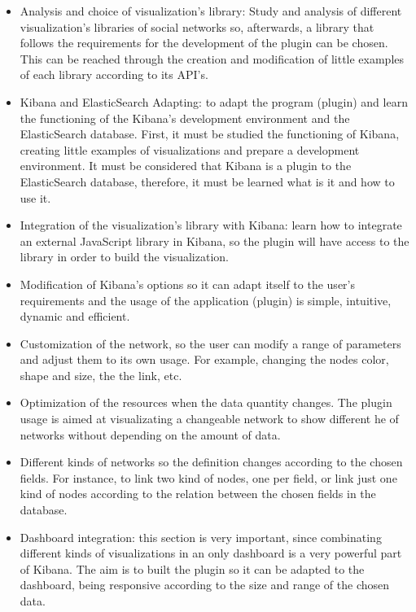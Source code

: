 \documentclass[a4paper, 12pt]{book}
\begin{document}
\begin{itemize}
\item Analysis and choice of visualization’s library: Study and analysis of different visualization’s libraries of social networks so, afterwards, a library that follows the requirements for the development of the plugin can be chosen. This can be reached through the creation and modification of little examples of each library according to its API's.
\item Kibana and ElasticSearch Adapting: to adapt the program (plugin) and learn the functioning of the Kibana's development environment and the ElasticSearch database. First, it must be studied the functioning of Kibana, creating little examples of visualizations and prepare a development environment. It must be considered that Kibana is a plugin to the ElasticSearch database, therefore, it must be learned what is it and how to use it.
\item Integration of the visualization’s library with Kibana: learn how to integrate an external JavaScript library in Kibana, so the plugin will have access to the library in order to build the visualization.
\item Modification of Kibana's options so it can adapt itself to the user's requirements and the usage of the application (plugin) is simple, intuitive, dynamic and efficient.
\item Customization of the network, so the user can modify a range of parameters and adjust them to its own usage. For example, changing the nodes color, shape and size, the the link, etc.
\item Optimization of the resources when the data quantity changes. The plugin usage is aimed at visualizating a changeable network to show different he of networks without depending on the amount of data.
\item Different kinds of networks so the definition changes according to the chosen fields. For instance, to link two kind of nodes, one per field, or link just one kind of nodes according to the relation between the chosen fields in the database.
\item Dashboard integration: this section is very important, since combinating different kinds of visualizations in an only dashboard is a very powerful part of Kibana. The aim is to built the plugin so it can be adapted to the dashboard, being responsive according to the size and range of the chosen data.
\end{itemize}
\end{document}
